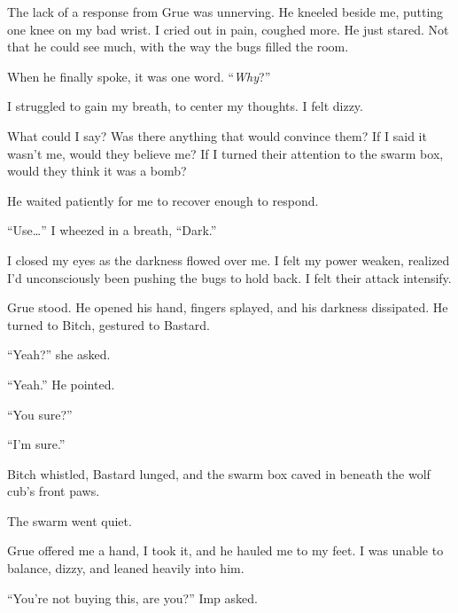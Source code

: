 The lack of a response from Grue was unnerving.  He kneeled beside me, putting one knee on my bad wrist.  I cried out in pain, coughed more.  He just stared.  Not that he could see much, with the way the bugs filled the room.



When he finally spoke, it was one word.  ``\emph{Why}?''



I struggled to gain my breath, to center my thoughts.  I felt dizzy.



What could I say?  Was there anything that would convince them?  If I said it wasn't me, would they believe me?  If I turned their attention to the swarm box, would they think it was a bomb?



He waited patiently for me to recover enough to respond.



``Use\ldots'' I wheezed in a breath, ``Dark.''



I closed my eyes as the darkness flowed over me.  I felt my power weaken, realized I'd unconsciously been pushing the bugs to hold back.  I felt their attack intensify.



Grue stood.  He opened his hand, fingers splayed, and his darkness dissipated.  He turned to Bitch, gestured to Bastard.



``Yeah?'' she asked.



``Yeah.''  He pointed.



``You sure?''



``I'm sure.''



Bitch whistled, Bastard lunged, and the swarm box caved in beneath the wolf cub's front paws.



The swarm went quiet.



Grue offered me a hand, I took it, and he hauled me to my feet.  I was unable to balance, dizzy, and leaned heavily into him.



``You're not buying this, are you?'' Imp asked.



